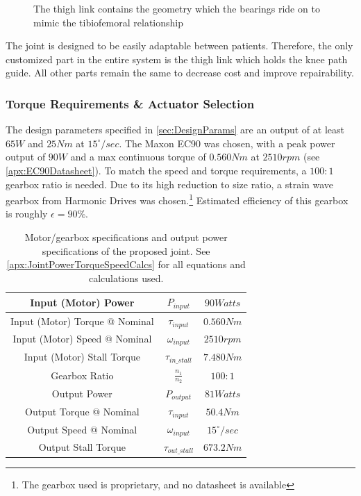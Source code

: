 \begin{figure}[ht!]
    \centering
    \caption{The thigh link contains the geometry which the bearings ride on to mimic the tibiofemoral relationship}
    \label{fig:CenterPlateGeometry}
\end{figure}

The joint is designed to be easily adaptable between patients. Therefore, the only customized part in the entire system is the thigh link which holds the knee path guide. All other parts remain the same to decrease cost and improve repairability.

\subsubsection{Torque Requirements \& Actuator Selection}

The design parameters specified in \autoref{sec:DesignParams} are an output of at least \(65 W\) and \(25 Nm\) at \(15^\circ/sec\). The Maxon EC90 was chosen, with a peak power output of \(90W\) and a max continuous torque of \(0.560 Nm\) at \(2510 rpm\) (see \autoref{apx:EC90Datasheet}). To match the speed and torque requirements, a \(100:1\) gearbox ratio is needed. Due to its high reduction to size ratio, a strain wave gearbox from {Harmonic Drives\texttrademark} was chosen.\footnote{The gearbox used is proprietary, and no datasheet is available} Estimated efficiency of this gearbox is roughly \(\epsilon = 90\%\).

\begin{table}
    \centering
    \begin{tabular}{||c|c|c||}
        \hline
        Input (Motor) Power & \(P_{input}\) & \(90 Watts\) \\
        \hline
        Input (Motor) Torque @ Nominal & \(\tau_{input}\) & \(0.560 Nm\) \\
        \hline
        Input (Motor) Speed @ Nominal & \(\omega_{input}\) & \(2510 rpm\) \\
        \hline
        Input (Motor) Stall Torque & \(\tau_{in\_stall}\) & \(7.480 Nm\) \\
        \hline \hline
        Gearbox Ratio & \(\frac{n_1}{n_2}\) & \(100:1\) \\
        \hline \hline
        Output Power & \(P_{output}\) & \(81 Watts\) \\
        \hline
        Output Torque @ Nominal & \(\tau_{input}\) & \(50.4 Nm\) \\
        \hline
        Output Speed @ Nominal & \(\omega_{input}\) & \(15^\circ/sec\) \\
        \hline
        Output Stall Torque & \(\tau_{out\_stall}\) & \(673.2 Nm\) \\
        \hline
    \end{tabular}
    \caption{Motor/gearbox specifications and output power specifications of the proposed joint. See \autoref{apx:JointPowerTorqueSpeedCalcs} for all equations and calculations used.}
    \label{table:MotorGearboxSpecs}
\end{table}

